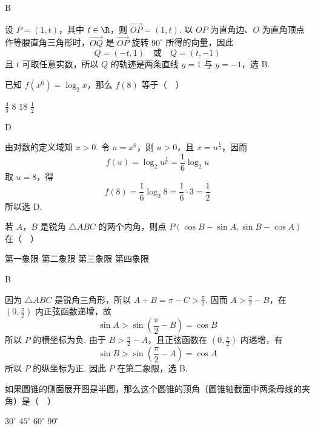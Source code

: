 \begin{answer}
B
\end{answer}

\begin{solution}
设 \(P=(1,t)\)，其中 \(t\in\R\)，则 \(\overrightarrow{OP}=(1,t)\). 以 \(OP\) 为直角边、\(O\) 为直角顶点作等腰直角三角形时，\(\overrightarrow{OQ}\) 是 \(\overrightarrow{OP}\) 旋转 \(90^\circ\) 所得的向量，因此
\[
Q=(-t,1)\quad\text{或}\quad Q=(t,-1)
\]
且 \(t\) 可取任意实数，所以 \(Q\) 的轨迹是两条直线 \(y=1\) 与 \(y=-1\)，选 B.
\end{solution}

\begin{problem}
已知 \( f(x^{6}) = \log_2 x \)，那么 \( f(8) \) 等于（\(\quad\)）

\choices
    {\( \frac{4}{3} \)}
    {\(8\)}
    {\(18\)}
    {\( \frac{1}{2} \)}
\end{problem}

\begin{answer}
D
\end{answer}

\begin{solution}
由对数的定义域知 \(x>0\). 令 \(u=x^6\)，则 \(u>0\)，且 \(x=u^{\frac{1}{6}}\)，因而
\[
f(u)=\log_2u^{\frac{1}{6}}=\frac16\log_2u
\]
取 \(u=8\)，得
\[
f(8)=\frac16\log_2 8=\frac16\cdot3=\frac12
\]
所以选 D.
\end{solution}

\begin{problem}
若 \(A\)，\(B\) 是锐角 \(\triangle ABC\) 的两个内角，则点 \(P(\cos B - \sin A, \sin B - \cos A)\) 在（\(\quad\)）

\choices
    {第一象限}
    {第二象限}
    {第三象限}
    {第四象限}
\end{problem}

\begin{answer}
B
\end{answer}

\begin{solution}
因为 \(\triangle ABC\) 是锐角三角形，所以 \(A+B=\pi-C>\frac\pi2\). 因而 \(A>\frac\pi2-B\)，在 \(\left(0,\frac\pi2\right)\) 内正弦函数递增，故
\[
\sin A>\sin\left(\frac\pi2-B\right)=\cos B
\]
所以 \(P\) 的横坐标为负. 由于 \(B>\frac\pi2-A\)，且正弦函数在 \(\left(0,\frac\pi2\right)\) 内递增，有
\[
\sin B>\sin\left(\frac\pi2-A\right)=\cos A
\]
所以 \(P\) 的纵坐标为正. 因此 \(P\) 在第二象限，选 B.
\end{solution}

\begin{problem}
如果圆锥的侧面展开图是半圆，那么这个圆锥的顶角（圆锥轴截面中两条母线的夹角）是（\(\quad\)）

\choices
    {\(30^{\circ}\)}
    {\(45^{\circ}\)}
    {\(60^{\circ}\)}
    {\(90^{\circ}\)}
\end{problem}

